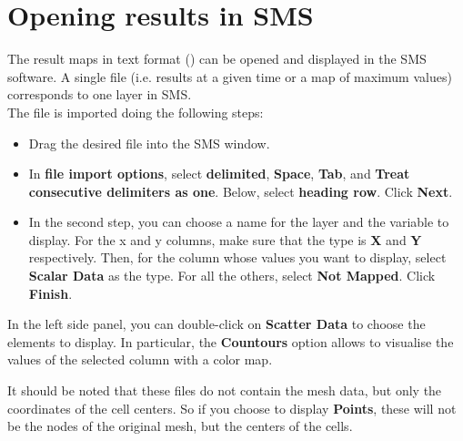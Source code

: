 \section{Opening results in SMS}

The result maps in text format () can be opened and displayed in the SMS software. A single file (i.e. results at a given time or a map of maximum values) corresponds to one layer in SMS.\\

The file is imported doing the following steps:
\begin{itemize}
  \item Drag the desired file into the SMS window.
  \item In \textbf{file import options}, select \textbf{delimited}, \textbf{Space}, \textbf{Tab}, and \textbf{Treat consecutive delimiters as one}. Below, select \textbf{heading row}. Click \textbf{Next}.
  \item In the second step, you can choose a name for the layer and the variable to display. For the x and y columns, make sure that the type is \textbf{X} and \textbf{Y} respectively. Then, for the column whose values you want to display, select \textbf{Scalar Data} as the type. For all the others, select \textbf{Not Mapped}. Click \textbf{Finish}.
\end{itemize}

In the left side panel, you can double-click on \textbf{Scatter Data} to choose the elements to display. In particular, the \textbf{Countours} option allows to visualise the values of the selected column with a color map.

It should be noted that these files do not contain the mesh data, but only the coordinates of the cell centers. So if you choose to display \textbf{Points}, these will not be the nodes of the original mesh, but the centers of the cells.